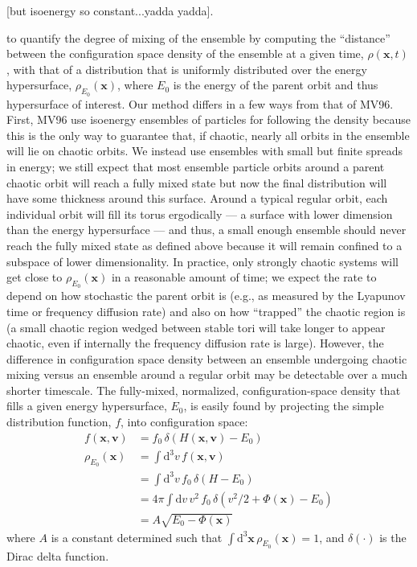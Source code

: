 \documentclass[letterpaper,12pt,preprint]{aastex}
\newcommand{\dd}{\mathrm{d}}
\newcommand{\bs}[1]{\boldsymbol{#1}}
\begin{document}
 [but isoenergy so constant...yadda yadda].

to quantify the degree of mixing of the ensemble by computing the ``distance'' between the configuration space density of the ensemble at a given time, $\rho(\bs{x},t)$, with that of a distribution that is uniformly distributed over the energy hypersurface, $\rho_{E_0}(\bs{x})$, where $E_0$ is the energy of the parent orbit and thus hypersurface of interest. Our method differs in a few ways from that of MV96. First, MV96 use isoenergy ensembles of particles for following the density because this is the only way to guarantee that, if chaotic, nearly all orbits in the ensemble will lie on chaotic orbits. We instead use ensembles with small but finite spreads in energy; we still expect that most ensemble particle orbits around a parent chaotic orbit will reach a fully mixed state but now the final distribution will have some thickness around this surface. Around a typical regular orbit, each individual orbit will fill its torus ergodically --- a surface with lower dimension than the energy hypersurface --- and thus, a small enough ensemble should never reach the fully mixed state as defined above because it will remain confined to a subspace of lower dimensionality. In practice, only strongly chaotic systems will get close to $\rho_{E_0}(\bs{x})$ in a reasonable amount of time; we expect the rate to depend on how stochastic the parent orbit is (e.g., as measured by the Lyapunov time or frequency diffusion rate) and also on how ``trapped'' the chaotic region is (a small chaotic region wedged between stable tori will take longer to appear chaotic, even if internally the frequency diffusion rate is large). However, the difference in configuration space density between an ensemble undergoing chaotic mixing versus an ensemble around a regular orbit may be detectable over a much shorter timescale. The fully-mixed, normalized, configuration-space density that fills a given energy hypersurface, $E_0$, is easily found by projecting the simple distribution function, $f$, into configuration space:
\begin{align}
	f(\bs{x}, \bs{v}) &= f_0 \, \delta(H(\bs{x}, \bs{v}) - E_0)\\
	\rho_{E_0}(\bs{x}) &= \int \dd^3v \, f(\bs{x}, \bs{v})\\
	&= \int \dd^3v \, f_0 \, \delta(H - E_0)\\
	&= 4\pi \int \dd v \, v^2 \, f_0 \, \delta\left(v^2/2 + \Phi(\bs{x}) - E_0\right)\\
	&= A \sqrt{E_0 - \Phi(\bs{x})}\label{eq:mixeddensity}
\end{align}
where $A$ is a constant determined such that $\int \dd^3\bs{x} \, \rho_{E_0}(\bs{x}) = 1$, and $\delta(\cdot)$ is the Dirac delta function. 
\end{document}
